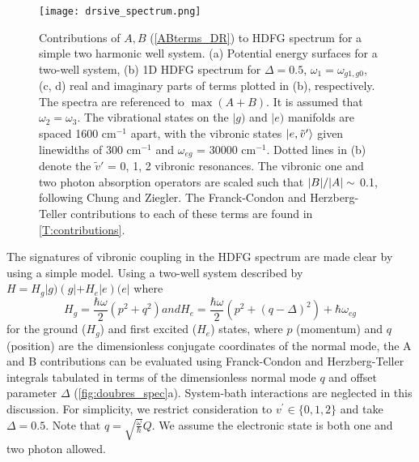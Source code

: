 \documentclass[aip, jcp, reprint, onecolumn, nofootinbib]{revtex4-2}
\begin{document}
\begin{figure}[!htbp]
	\centering
	\texttt{[image: drsive\_spectrum.png]}
	\caption{Contributions of $A, B$ (\autoref{ABterms_DR}) to HDFG spectrum for a simple two harmonic well system.
		(a) Potential energy surfaces for a two-well system, (b) 1D HDFG spectrum for $\Delta = 0.5$, $\omega_1 = \omega_{g1, g0}$, (c, d) real and imaginary parts of terms plotted in (b), respectively.
		The spectra are referenced to $\max{(A+B)}$. 
		It is assumed that $\omega_2 = \omega_3$.
		The vibrational states on the $|g)$ and $|e)$ manifolds are spaced 1600 cm$^{-1}$ apart, with the vibronic states $\ket{e,\tilde{v}'}$ given linewidths of 300 cm$^{-1}$ and $\omega_{eg}$ = 30000 cm$^{-1}$.
		Dotted lines in (b) denote the $\tilde{v}'$ = 0, 1, 2 vibronic resonances. 
		The vibronic one and two photon absorption operators are scaled such that $\abs{B}/\abs{A} \sim$ 0.1, following Chung and Ziegler. \cite{Ziegler1988}
		The Franck-Condon and Herzberg-Teller contributions to each of these terms are found in \autoref{T:contributions}.}
	\label{fig:doubres_spec}
\end{figure}

The signatures of vibronic coupling in the HDFG spectrum are made clear by using a simple model.
Using a two-well system described by $H = H_g |g) \left(g| + H_e |e\right) (e|$ where
\begin{subequations}\label{Hamiltonian}
	\begin{equation}
		H_g = \frac{\hbar \omega }{2} \left(p^2 + q^2 \right)
	\end{equation}
	and
	\begin{equation}
		H_e = \frac{\hbar \omega }{2} \left(p^2 +  (q-\Delta)^2 \right) + \hbar \omega_{eg}
	\end{equation}
\end{subequations}
for the ground ($H_g$) and first excited ($H_e$) states, where $p$ (momentum) and $q$ (position) are the dimensionless conjugate coordinates of the normal mode, the A and B contributions can be evaluated using Franck-Condon and Herzberg-Teller integrals tabulated in terms of the dimensionless normal mode $q$ and offset parameter $\Delta$ (\autoref{fig:doubres_spec}a).
System-bath interactions are neglected in this discussion.
For simplicity, we restrict consideration to $v^\prime \in \{0,1,2\}$ and take $\Delta = 0.5$.
Note that $q = \sqrt{\frac{\omega}{\hbar}} Q$.
We assume the electronic state is both one and two photon allowed.
\end{document}
